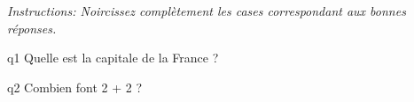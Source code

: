 \documentclass[a4paper]{article}
\begin{document}
 \hfill {}

\begin{center}\em
Instructions: Noircissez complètement les cases correspondant aux bonnes réponses.
\end{center}

\champnom{\fbox{%
  \begin{minipage}{4cm}
    \vspace*{.5cm}\dotfill\\
    \vspace*{.5cm}\dotfill\\
    \vspace*{1mm}
  \end{minipage}%
}}

\AMCcleardoublepage

\begin{multicols}{2}


\begin{question}{q1}
  Quelle est la capitale de la France ?
  \begin{choices}
  \end{choices}
\end{question}

\begin{question}{q2}
  Combien font 2 + 2 ?
  \begin{choices}
  \end{choices}
\end{question}

\end{multicols}
\end{document}
